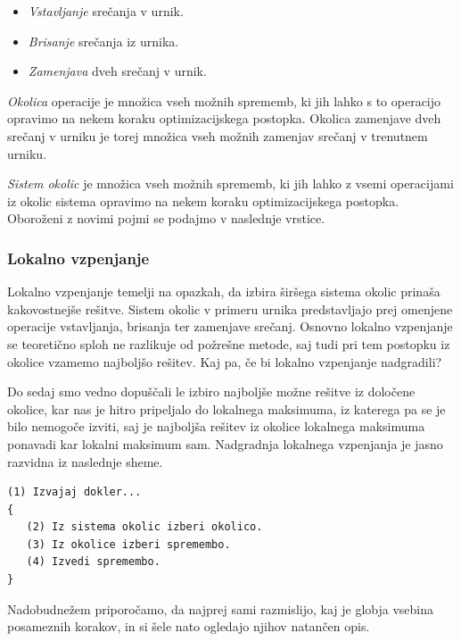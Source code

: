 \documentclass[a4paper,10pt]{article}
\begin{document}
\begin{itemize}
   

  \item  \emph{Vstavljanje} srečanja v urnik.
  \item  \emph{Brisanje} srečanja iz urnika.
  \item  \emph{Zamenjava} dveh srečanj v urnik.
\end{itemize}
\noindent



\emph{Okolica} operacije je množica vseh možnih sprememb, ki jih lahko s to operacijo
opravimo na nekem koraku optimizacijskega postopka. Okolica zamenjave dveh srečanj v urniku
je torej množica vseh možnih zamenjav srečanj v trenutnem urniku.

\emph{Sistem okolic} je množica vseh možnih sprememb, ki jih lahko z vsemi operacijami iz
okolic sistema opravimo na nekem koraku optimizacijskega postopka. Oboroženi z novimi pojmi
se podajmo v naslednje vrstice.

 \subsubsection{Lokalno vzpenjanje}

Lokalno vzpenjanje temelji na opazkah, da izbira širšega sistema okolic prinaša kakovostnejše
rešitve. Sistem okolic v primeru urnika predstavljajo prej omenjene operacije vstavljanja,
brisanja ter zamenjave srečanj. Osnovno lokalno vzpenjanje se teoretično sploh ne razlikuje
od požrešne metode, saj tudi pri tem postopku iz okolice vzamemo najboljšo rešitev. Kaj pa,
če bi lokalno vzpenjanje nadgradili?

Do sedaj smo vedno dopuščali le izbiro najboljše možne rešitve iz določene okolice, kar nas
je hitro pripeljalo do lokalnega maksimuma, iz katerega pa se je bilo nemogoče izviti, saj
je najboljša rešitev iz okolice lokalnega maksimuma ponavadi kar lokalni maksimum sam.
Nadgradnja lokalnega vzpenjanja je jasno razvidna iz naslednje sheme.

\begin{verbatim}
(1) Izvajaj dokler...
{
   (2) Iz sistema okolic izberi okolico.
   (3) Iz okolice izberi spremembo.
   (4) Izvedi spremembo.
}
\end{verbatim}

\noindent

Nadobudnežem priporočamo, da najprej sami razmislijo, kaj je globja vsebina posameznih
korakov, in si šele nato ogledajo njihov natančen opis.
\end{document}
